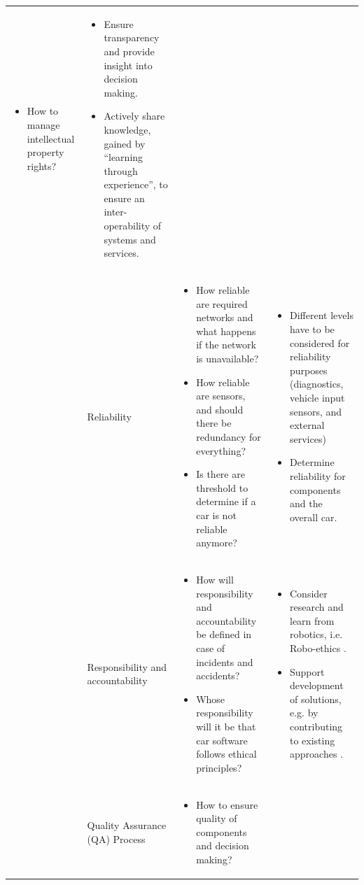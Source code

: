 \begin{table}
\begin{small}
\begin{supertabular}{>{}p{.02\textwidth}|>{\raggedright}p{.105\textwidth}>{\raggedright}p{.4\textwidth}>{\raggedright}p{.4\textwidth}}
\begin{itemize}
					\item How to manage intellectual property rights?
				\end{itemize}
			& 
				\begin{itemize}
					\item Ensure transparency and provide insight into decision making.
					\item Actively share knowledge, gained by \enquote{learning through experience}, to ensure an inter-operability of systems and services.
				\end{itemize}
 			 \tabularnewline {}
			& Reliability & 
				\begin{itemize}
					\item How reliable are required networks and what happens if the network is unavailable?
					\item How reliable are sensors, and should there be redundancy for everything?
					\item Is there are threshold to determine if a car is not reliable anymore?
				\end{itemize}	
			& 
				\begin{itemize}
					\item Different levels have to be considered for reliability purposes (diagnostics, vehicle input sensors, and external services)
					\item Determine reliability for components and the overall car. 
				\end{itemize}
 			 \tabularnewline {}
			& Responsibility and accountability & 
				\begin{itemize}
					\item How will responsibility and accountability be defined in case of incidents and accidents?
					\item Whose responsibility will it be that car software follows ethical principles?
				\end{itemize}
			& 
				\begin{itemize}
					\item Consider research and learn from robotics, i.e. Robo-ethics \cite{Dodig-Crnkovic:2008:SMR:1566864.1566888}.
					\item Support development of solutions, e.g. by contributing to existing approaches \cite{DepartmentforTransportDfT2017}.
				\end{itemize}
 			 \tabularnewline {}
			& Quality Assurance (QA) Process & 
				\begin{itemize}
				    \item How to ensure quality of components and decision making?

\end{itemize}
\end{supertabular}
\end{small}
\end{table}
